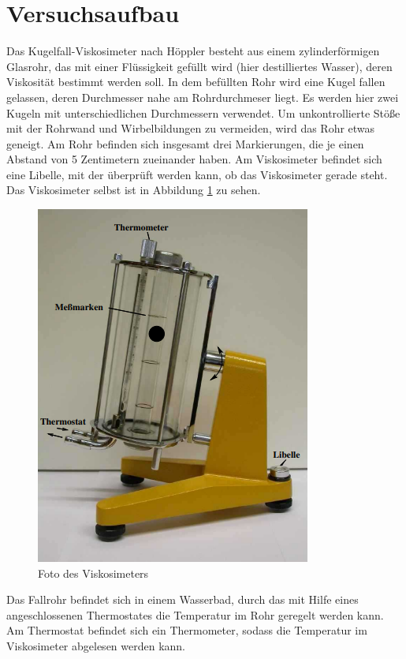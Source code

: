 \section{Versuchsaufbau}
\label{sec:durchfuehrung}
Das Kugelfall-Viskosimeter nach Höppler besteht aus einem zylinderförmigen Glasrohr,
das mit einer Flüssigkeit gefüllt wird (hier destilliertes Wasser), deren Viskosität bestimmt werden soll. 
In dem befüllten Rohr wird eine Kugel fallen gelassen, deren Durchmesser nahe am Rohrdurchmeser liegt.
Es werden hier zwei Kugeln mit unterschiedlichen Durchmessern verwendet. 
Um unkontrollierte Stöße mit der Rohrwand und Wirbelbildungen zu vermeiden, wird das Rohr etwas geneigt.
Am Rohr befinden sich insgesamt drei Markierungen, die je einen Abstand von 5 Zentimetern zueinander haben.
Am Viskosimeter befindet sich eine Libelle, mit der überprüft werden kann, ob das Viskosimeter gerade steht.
Das Viskosimeter selbst ist in Abbildung \ref{fig:viskosimeter} zu sehen.
\begin{figure}
    \centering
    \includegraphics[]{versuchsaufbau.png}
    \caption[]{Foto des Viskosimeters \cite[übern. aus][]{va207}}
    \label{fig:viskosimeter}
\end{figure}
Das Fallrohr befindet sich in einem Wasserbad, durch das mit Hilfe eines angeschlossenen Thermostates die Temperatur im Rohr geregelt werden kann.
Am Thermostat befindet sich ein Thermometer, sodass die Temperatur im Viskosimeter abgelesen werden kann.

